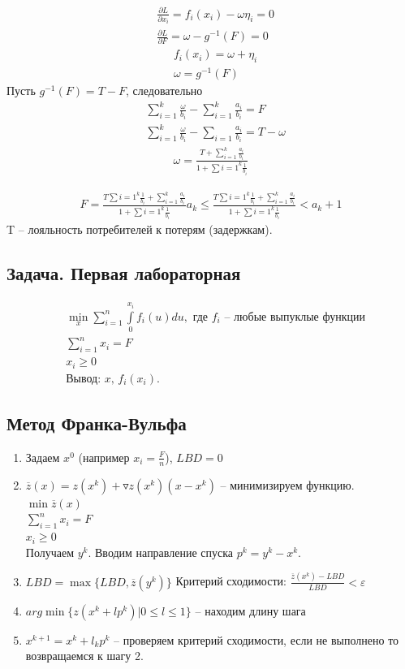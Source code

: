 \documentclass[12pt,a4paper,titlepage,oneside]{book}
\theoremstyle{definition}
\theoremstyle{plain}
\theoremstyle{remark}
\theoremstyle{remark}
\theoremstyle{plain}
\theoremstyle{plain}
\begin{document}
\begin{align*}
& \frac{\partial L}{\partial x_i} = f_i(x_i) - \omega \eta_i = 0\\
&\frac{\partial L}{\partial F} = \omega - g^{-1}(F) = 0
\end{align*}
\begin{align*}
&f_i(x_i) = \omega+\eta_i\\
&\omega = g^{-1}(F)
\end{align*}
Пусть $g^{-1}(F) = T-F$, следовательно
\begin{align*}
&\sum \limits_{i=1}^k \frac{\omega}{b_i} - \sum \limits_{i=1}^k \frac{a_i}{b_i} = F\\
&\sum\limits_{i=1}^k \frac{\omega}{b_i} - \sum\limits_{i=1} \frac{a_i}{b_i} = T - \omega
\end{align*}
\begin{align*}
\omega = \frac{T + \sum \limits_{i=1}^k \frac{a_i}{b_i}}{1+\sum\limits{i=1}^k \frac{1}{b_i}}
\end{align*}

\begin{align*}
F =\frac{ T \sum\limits{i=1}^k \frac{1}{b_i} + \sum \limits_{i=1}^k \frac{a_i}{b_i}}{1+\sum\limits{i=1}^k \frac{1}{b_i}}
a_k \leq \frac{ T \sum\limits{i=1}^k \frac{1}{b_i} + \sum \limits_{i=1}^k \frac{a_i}{b_i}}{1+\sum\limits{i=1}^k \frac{1}{b_i}} < a_k+1
\end{align*}
T -- лояльность потребителей к потерям (задержкам).
\subsection{Задача. Первая лабораторная}
\begin{align*}
&\min \limits_x \sum \limits_{i=1}^n \int\limits_0^{x_i} f_i(u)du, \text{ где $f_i$ -- любые выпуклые функции}\\
&\sum\limits_{i=1}^n x_i =F\\
&x_i \geq 0\\
&\text{Вывод: $x$, $f_i(x_i)$.}
\end{align*}

\subsection{Метод Франка-Вульфа}
\begin{enumerate}
\item Задаем $x^0$ (например $x_i = \frac{F}{n}$), $LBD = 0$
\item $\overline{z}(x) = z(x^k)+ \triangledown z(x^k)(x-x^k)$ -- минимизируем функцию.\\
$\min \overline{z}(x)$\\
$\sum\limits_{i=1}^n x_i =F$\\
$x_i \geq 0$ \\
Получаем $y^k$. Вводим направление спуска $p^k = y^k -x^k$.
\item $LBD = \max \{LBD, \overline{z}(y^k) \}$
Критерий сходимости: $\frac{\overline{z}(x^k) - LBD}{LBD} < \varepsilon$
\item $arg\min \{z(x^k+lp^k) | 0\leq l\leq 1 \}$ -- находим длину шага
\item $x^{k+1} = x^k + l_k p^k$  -- проверяем критерий сходимости, если не выполнено то возвращаемся к шагу 2.
\end{enumerate}
\end{document}
